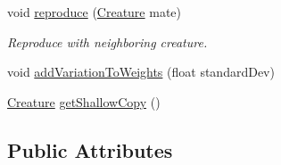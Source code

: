 \begin{DoxyCompactItemize}
void \mbox{\hyperlink{class_creature_abd5e8fd01b4197fdb549fd38da914f2a}{reproduce}} (\mbox{\hyperlink{class_creature}{Creature}} mate)
\begin{DoxyCompactList}\small\item\em Reproduce with neighboring creature. \end{DoxyCompactList}\item 
void \mbox{\hyperlink{class_creature_a31a49fbd361a70ff3f1f41886519d0c5}{add\+Variation\+To\+Weights}} (float standard\+Dev)
\item 
\mbox{\hyperlink{class_creature}{Creature}} \mbox{\hyperlink{class_creature_a1095c7239ce30cb170ec739c343719fb}{get\+Shallow\+Copy}} ()
\end{DoxyCompactItemize}
\subsection*{Public Attributes}

